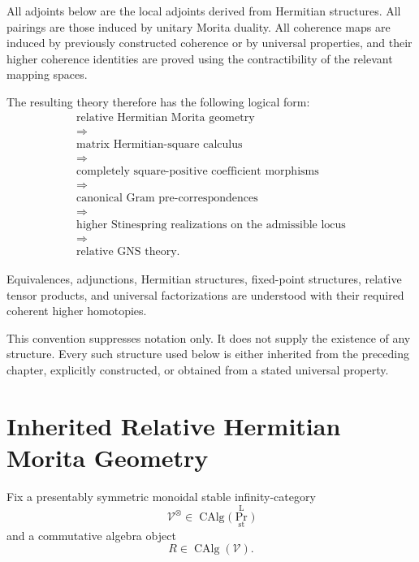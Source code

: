 All adjoints below are the local adjoints derived from Hermitian structures.
All pairings are those induced by unitary Morita duality. All coherence maps
are induced by previously constructed coherence or by universal properties,
and their higher coherence identities are proved using the contractibility of
the relevant mapping spaces.

The resulting theory therefore has the following logical form:
\[
  \boxed{
  \begin{gathered}
    \text{relative Hermitian Morita geometry}
    \\
    \Longrightarrow
    \\
    \text{matrix Hermitian-square calculus}
    \\
    \Longrightarrow
    \\
    \text{completely square-positive coefficient morphisms}
    \\
    \Longrightarrow
    \\
    \text{canonical Gram pre-correspondences}
    \\
    \Longrightarrow
    \\
    \text{higher Stinespring realizations on the admissible locus}
    \\
    \Longrightarrow
    \\
    \text{relative GNS theory.}
  \end{gathered}
  }
\]

\begin{convention}
\label{conv:higher-stinespring-coherent-data}
Equivalences, adjunctions, Hermitian structures, fixed-point structures,
relative tensor products, and universal factorizations are understood with
their required coherent higher homotopies.

This convention suppresses notation only. It does not supply the existence of
any structure. Every such structure used below is either inherited from the
preceding chapter, explicitly constructed, or obtained from a stated universal
property.
\end{convention}

\section{Inherited Relative Hermitian Morita Geometry}
\label{sec:higher-stinespring-inherited-setting}

Fix a presentably symmetric monoidal stable infinity-category
\[
  \mathcal V^\otimes
  \in
  \operatorname{CAlg}
  \bigl(
    \operatorname{Pr}^{\mathrm L}_{\mathrm{st}}
  \bigr)
\]
and a commutative algebra object
\[
  R\in\operatorname{CAlg}(\mathcal V).
\]

